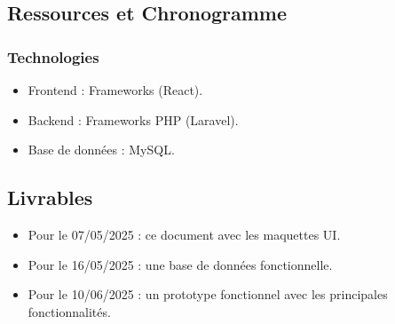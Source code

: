 \subsection{Ressources et Chronogramme}

\subsubsection{Technologies}
\begin{itemize}
    \item Frontend : Frameworks (React).
    \item Backend : Frameworks PHP (Laravel).
    \item Base de données : MySQL.
\end{itemize}

\subsection{Livrables}
\begin{itemize}
    \item Pour le 07/05/2025 : ce document avec les maquettes UI.
    \item Pour le 16/05/2025 : une base de données fonctionnelle.
    \item Pour le 10/06/2025 : un prototype fonctionnel avec les principales fonctionnalités.
\end{itemize}
